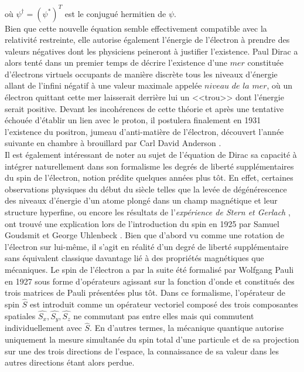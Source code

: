         où $\psi^{\dag}=(\psi^*)^T$ est le conjugué hermitien de $\psi$. \\
        
        Bien que cette nouvelle équation semble effectivement compatible avec la relativité restreinte, elle autorise également l'énergie de l'électron à prendre des valeurs négatives dont les physiciens peineront à justifier l'existence. Paul Dirac a alors tenté dans un premier temps de décrire l'existence d'une $\textit{mer}$ constituée d'électrons virtuels occupants de manière discrète tous les niveaux d'énergie allant de l'infini négatif à une valeur maximale appelée $\textit{niveau de la mer}$, où un électron quittant cette mer laisserait derrière lui un <<trou>> dont l'énergie serait positive. Devant les incohérences de cette théorie et après une tentative échouée d'établir un lien avec le proton, il postulera finalement en 1931 l'existence du positron, jumeau d'anti-matière de l'électron, découvert l'année suivante en chambre à brouillard par Carl David Anderson \cite{Anderson1932}. \\
        
        Il est également intéressant de noter au sujet de l'équation de Dirac sa capacité à intégrer naturellement dans son formalisme les degrés de liberté supplémentaires du spin de l'électron, notion prédite quelques années plus tôt. En effet, certaines observations physiques du début du siècle telles que la levée de dégénérescence des niveaux d'énergie d'un atome plongé dans un champ magnétique et leur structure hyperfine, ou encore les résultats de l'\textit{expérience de Stern et Gerlach} \cite{Gerlach1922}, ont trouvé une explication lors de l'introduction du spin en 1925 par Samuel Goudsmit et George Uhlenbeck \cite{Uhlenbeck1925}. Bien que d'abord vu comme une rotation de l'électron sur lui-même, il s'agit en réalité d'un degré de liberté supplémentaire sans équivalent classique davantage lié à des propriétés magnétiques que mécaniques. Le spin de l'électron a par la suite été formalisé par Wolfgang Pauli en 1927 sous forme d'opérateurs agissant sur la fonction d'onde et constitués des trois matrices de Pauli présentées plus tôt. Dans ce formalisme, l'opérateur de spin $\hat{S}$ est introduit comme un opérateur vectoriel composé des trois composantes spatiales $\hat{S_x}, \hat{S_y}, \hat{S_z}$ ne commutant pas entre elles mais qui commutent individuellement avec $\hat{S}$. En d'autres termes, la mécanique quantique autorise uniquement la mesure simultanée du spin total d'une particule et de sa projection sur une des trois directions de l'espace, la connaissance de sa valeur dans les autres directions étant alors perdue.
        
